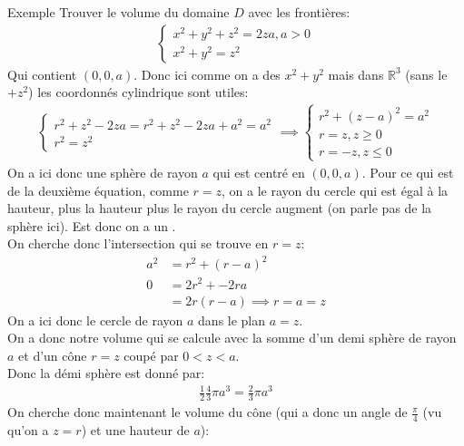 \begin{parag}{Exemple}
    Trouver le volume du domaine $D$ avec les frontières:
    \begin{align*} 
        \begin{cases}
            x^2 + y^2 + z^2 =  2za, a > 0\\
            x^2 + y^2 =  z^2
        \end{cases}
    \end{align*}
    Qui contient $\left(0, 0, a\right)$. Donc ici comme on a des $x^2 + y^2$ mais dans $\mathbb{R}^{3}$ (sans le $+ z^2$) les coordonnés cylindrique sont utiles:
    \begin{align*} 
        \begin{cases}
            r^2 + z^2 - 2za = r^2 + z^2 - 2za + a^2 = a^2\\
            r^2 =  z^2
        \end{cases} \implies 
        \begin{cases}
            r^2 + \left(z-a\right)^2 =  a^2\\
            r = z, z \geq 0\\
            r =  -z, z \leq 0
        \end{cases}
    \end{align*}
    On a ici donc une sphère de rayon $a$ qui est centré en $\left(0, 0, a\right)$. Pour ce qui est de la deuxième équation, comme $r = z$, on a le rayon du cercle qui est égal à la hauteur, plus la hauteur plus le rayon du cercle augment (on parle pas de la sphère ici). Est donc on a un .\\
    On cherche donc l'intersection qui se trouve en $r = z$:
    \begin{align*} 
        a^2 &= r^2 + \left(r-a\right)^2 \\
           0 &=2r^2 + -2ra\\
             &= 2r\left(r-a\right) \implies r = a= z
    \end{align*}
    On a ici donc le cercle de rayon $a$ dans le plan $a = z$.\\
    On a donc notre volume qui se calcule avec la somme d'un demi sphère de rayon $a$ et d'un cône $r = z$ coupé par $0 < z < a$.\\
    Donc la démi sphère est donné par:
    \begin{align*} \frac{1}{2}\frac{4}{3}\pi a^3 =  \frac{2}{3}\pi a^3 \end{align*}
    On cherche donc maintenant le volume du cône (qui a donc un angle de $\frac{\pi}{4}$ (vu qu'on a $z = r$) et une hauteur de $a$):

\end{parag}

